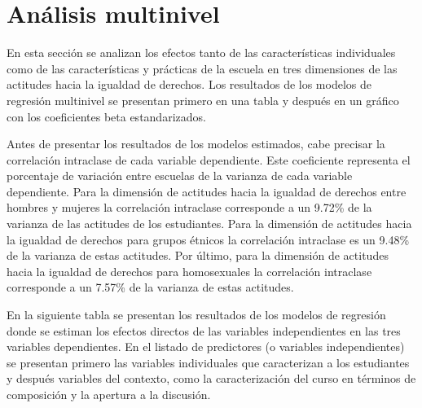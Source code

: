 \documentclass[12pt,twoside]{templates/facsothesis}
\begin{document}
\hypertarget{anuxe1lisis-multinivel}{%
\section{Análisis multinivel}\label{anuxe1lisis-multinivel}}

En esta sección se analizan los efectos tanto de las características individuales como de las características y prácticas de la escuela en tres dimensiones de las actitudes hacia la igualdad de derechos. Los resultados de los modelos de regresión multinivel se presentan primero en una tabla y después en un gráfico con los coeficientes beta estandarizados.

Antes de presentar los resultados de los modelos estimados, cabe precisar la correlación intraclase de cada variable dependiente. Este coeficiente representa el porcentaje de variación entre escuelas de la varianza de cada variable dependiente. Para la dimensión de actitudes hacia la igualdad de derechos entre hombres y mujeres la correlación intraclase corresponde a un 9.72\% de la varianza de las actitudes de los estudiantes. Para la dimensión de actitudes hacia la igualdad de derechos para grupos étnicos la correlación intraclase es un 9.48\% de la varianza de estas actitudes. Por último, para la dimensión de actitudes hacia la igualdad de derechos para homosexuales la correlación intraclase corresponde a un 7.57\% de la varianza de estas actitudes.

En la siguiente tabla se presentan los resultados de los modelos de regresión donde se estiman los efectos directos de las variables independientes en las tres variables dependientes. En el listado de predictores (o variables independientes) se presentan primero las variables individuales que caracterizan a los estudiantes y después variables del contexto, como la caracterización del curso en términos de composición y la apertura a la discusión.
\end{document}
